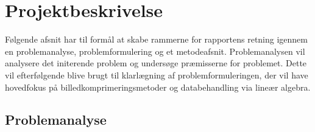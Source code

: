 \chapter{Projektbeskrivelse}
Følgende afsnit har til formål at skabe rammerne for rapportens retning igennem en problemanalyse, problemformulering og et metodeafsnit. Problemanalysen vil analysere det initerende problem og undersøge præmisserne for problemet. Dette vil efterfølgende blive brugt til klarlægning af problemformuleringen, der vil have hovedfokus på billedkomprimeringsmetoder og databehandling via lineær algebra.

\section{Problemanalyse}
%
%

